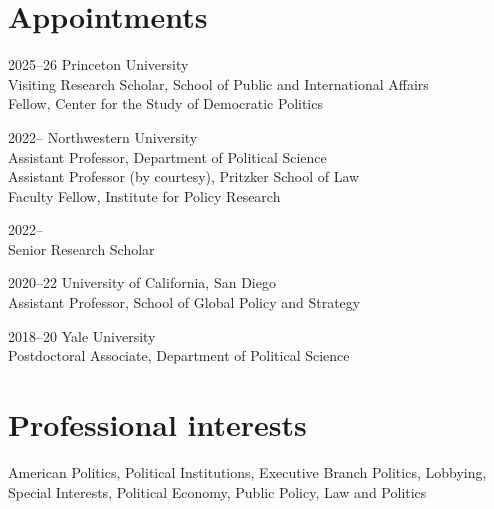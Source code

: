 \documentclass[12pt,letterpaper]{report}
\begin{document}
    \section*{Appointments}

    \begin{tablist}
        \item[2025--26] \tab{}Princeton University \\
                       Visiting Research Scholar, School of Public and International Affairs \\
                       Fellow, Center for the Study of Democratic Politics \\
        \item[2022--]  \tab{}Northwestern University\\
                        Assistant Professor, Department of Political Science \\
                        Assistant Professor (by courtesy), Pritzker School of Law \\
                        Faculty Fellow, Institute for Policy Research \\
                        
                        
        \item[2022--]   \\
                        Senior Research Scholar \\
                        
        \item[2020--22]   \tab{}University of California, San Diego \\
                             Assistant Professor, School of Global Policy and Strategy \\

        \item[2018--20] \tab{}Yale University \\
                             Postdoctoral Associate, Department of Political Science \\ 

    \end{tablist}

    \section*{Professional interests}
    American Politics, Political Institutions, Executive Branch Politics, Lobbying, Special Interests,  Political Economy, Public Policy, Law and Politics
\end{document}
